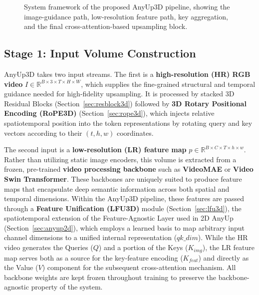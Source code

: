 \begin{figure}[htbp]
{%
}
\caption{System framework of the proposed AnyUp3D pipeline, showing the image-guidance path, low-resolution feature path, key aggregation, and the final cross-attention-based upsampling block.}
\label{fig:anyup3d_framework}
\end{figure}

\subsection{Stage 1: Input Volume Construction}

AnyUp3D takes two input streams. The first is a \textbf{high-resolution (HR) RGB video} $I \in \mathbb{R}^{B \times 3 \times T \times H \times W}$, which supplies the fine-grained structural and temporal guidance needed for high-fidelity upsampling. It is processed by stacked 3D Residual Blocks (Section~\ref{sec:resblock3d}) followed by \textbf{3D Rotary Positional Encoding (RoPE3D)} (Section~\ref{sec:rope3d}), which injects relative spatiotemporal position into the token representations by rotating query and key vectors according to their $(t, h, w)$ coordinates.

The second input is a \textbf{low-resolution (LR) feature map} $p \in \mathbb{R}^{B \times C \times T \times h \times w}$. Rather than utilizing static image encoders, this volume is extracted from a frozen, pre-trained \textbf{video processing backbone} such as \textbf{VideoMAE} or \textbf{Video Swin Transformer}. These backbones are uniquely suited to produce feature maps that encapsulate deep semantic information across both spatial and temporal dimensions. Within the AnyUp3D pipeline, these features are passed through a \textbf{Feature Unification (LFU3D)} module (Section~\ref{sec:lfu3d}), the spatiotemporal extension of the Feature-Agnostic Layer used in 2D AnyUp (Section~\ref{sec:anyup2d}), which employs a learned basis to map arbitrary input channel dimensions to a unified internal representation ($qk\_dim$). While the HR video generates the Queries ($Q$) and a portion of the Keys ($K_{img}$), the LR feature map serves both as a source for the key-feature encoding ($K_{feat}$) and directly as the Value ($V$) component for the subsequent cross-attention mechanism. All backbone weights are kept frozen throughout training to preserve the backbone-agnostic property of the system.

